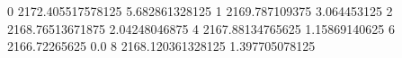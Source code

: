 0 2172.405517578125 5.682861328125
1 2169.787109375 3.064453125
2 2168.76513671875 2.04248046875
4 2167.88134765625 1.15869140625
6 2166.72265625 0.0
8 2168.120361328125 1.397705078125
